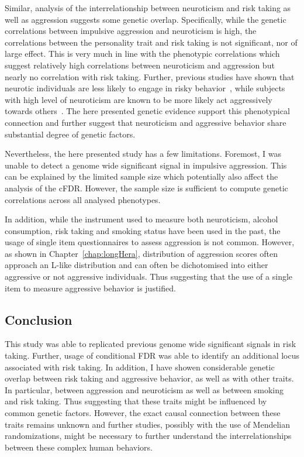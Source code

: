 Similar, analysis of the interrelationship between neuroticism and risk taking as well as aggression suggests some genetic overlap.
Specifically, while the genetic correlations between impulsive aggression and neuroticism is high, the correlations between the personality trait and risk taking is not significant, nor of large effect.
This is very much in line with the phenotypic correlations which suggest relatively high correlations between neuroticism and aggression but nearly no correlation with risk taking.
Further, previous studies have shown that neurotic individuals are less likely to engage in risky behavior~\cite{Lauriola2001,InstituteofMedicine2011,Paulus2003}, while subjects with high level of neuroticism are known to be more likely act aggressively towards others~\cite{Meesters2007}.
The here presented genetic evidence support this phenotypical connection and further suggest that neuroticism and aggressive behavior share substantial degree of genetic factors.

Nevertheless, the here presented study has a few limitations.
Foremost, I was unable to detect a genome wide significant signal in impulsive aggression.
This can be explained by the limited sample size which potentially also affect the analysis of the cFDR\@.
However, the sample size is sufficient to compute genetic correlations across all analysed phenotypes.

In addition, while the instrument used to measure both neuroticism, alcohol consumption, risk taking and smoking status have been used in the past, the usage of single item questionnaires to assess aggression is not common.
However, as shown in Chapter~\ref{chap:longHera}, distribution of aggression scores often approach an L-like distribution and can often be dichotomised into either aggressive or not aggressive individuals.
Thus suggesting that the use of a single item to measure aggressive behavior is justified.

\subsection{Conclusion}
\label{sub:conclusion}

This study was able to replicated previous genome wide significant signals in risk taking.
Further, usage of conditional FDR was able to identify an additional locus associated with risk taking.
In addition, I have showen considerable genetic overlap between risk taking and aggressive behavior, as well as with other traits.
In particular, between aggression and neuroticism as well as between smoking and risk taking.
Thus suggesting that these traits might be influenced by common genetic factors.
However, the exact causal connection between these traits remains unknown and further studies, possibly with the use of Mendelian randomizations, might be necessary to further understand the interrelationships between these complex human behaviors. 

